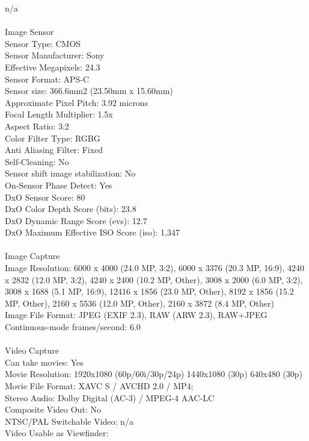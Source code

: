 \documentclass[12pt]{report}
\begin{document}
n/a
\\  \\Image Sensor
\\Sensor Type:
CMOS
\\Sensor Manufacturer:
Sony
\\Effective Megapixels:
24.3
\\Sensor Format:
APS-C
\\Sensor size:
366.6mm2 (23.50mm x 15.60mm)
\\Approximate Pixel Pitch:
3.92 microns
\\Focal Length Multiplier:
1.5x
\\Aspect Ratio:
3:2 
\\Color Filter Type:
RGBG
\\Anti Aliasing Filter:
Fixed
\\Self-Cleaning:
No
\\Sensor shift image stabilization:
No
\\On-Sensor Phase Detect:
Yes
\\DxO Sensor Score:
80
\\DxO Color Depth Score (bits):
23.8
\\DxO Dynamic Range Score (evs):
12.7
\\DxO Maximum Effective ISO Score (iso):
1,347
\\  \\Image Capture
\\Image Resolution:
6000 x 4000 (24.0 MP, 3:2),
6000 x 3376 (20.3 MP, 16:9),
4240 x 2832 (12.0 MP, 3:2),
4240 x 2400 (10.2 MP, Other),
3008 x 2000 (6.0 MP, 3:2),
3008 x 1688 (5.1 MP, 16:9),
12416 x 1856 (23.0 MP, Other),
8192 x 1856 (15.2 MP, Other),
2160 x 5536 (12.0 MP, Other),
2160 x 3872 (8.4 MP, Other) 
\\Image File Format:
JPEG (EXIF 2.3), RAW (ARW 2.3), RAW+JPEG 
\\Continuous-mode frames/second:
6.0
\\  \\Video Capture
\\Can take movies:
Yes
\\Movie Resolution:
1920x1080 (60p/60i/30p/24p) 
1440x1080 (30p) 
640x480 (30p) 
\\Movie File Format:
XAVC S / AVCHD 2.0 / MP4; \\Stereo Audio: Dolby Digital (AC-3) / MPEG-4 AAC-LC
\\Composite Video Out:
No
\\NTSC/PAL Switchable Video:
n/a
\\Video Usable as Viewfinder:
\end{document}
